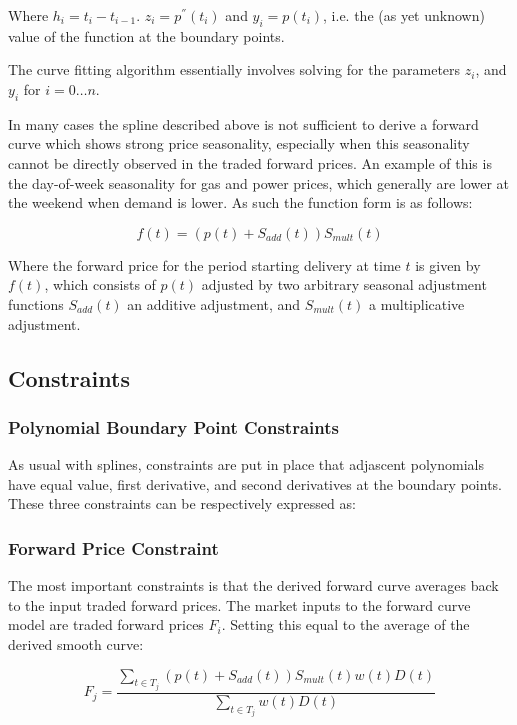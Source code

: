 \documentclass{article}
\begin{document}
Where $h_i =  t_i - t_{i-1}$. 
$z_i = p^{''}(t_i)$ and $y_i = p(t_i)$, i.e. the (as yet unknown) value of the function at
the boundary points.

The curve fitting algorithm essentially involves solving for the parameters
$z_i$, and $y_i$ for $i=0 \hdots n$.

\bigskip
In many cases the spline described above is not sufficient to derive a forward curve which
shows strong price seasonality, especially when this seasonality cannot be directly observed
in the traded forward prices. An example of this is the day-of-week seasonality for gas and
power prices, which generally are lower at the weekend when demand is lower. As such the 
function form is as follows:

\begin{equation}
    \label{eq:foward_function}
    f(t) = (p(t) + S_{add}(t))S_{mult}(t)
\end{equation}

Where the forward price for the period starting delivery at time $t$ is given by $f(t)$, which 
consists of $p(t)$ adjusted by two arbitrary seasonal adjustment functions
$S_{add}(t)$ an additive adjustment, and $S_{mult}(t)$ a multiplicative adjustment.


\subsection{Constraints}
\subsubsection{Polynomial Boundary Point Constraints}
As usual with splines, constraints are put in place that adjascent polynomials have equal value, first derivative, and second derivatives at the boundary points.
These three constraints can be respectively expressed as:

\subsubsection{Forward Price Constraint}
The most important constraints is that the derived forward curve averages back to the 
input traded forward prices.
The market inputs to the forward curve model are traded forward prices $F_i$.
Setting this equal to the average of the derived smooth curve:

\begin{equation}
    \label{eq:traded_forward_calc}
    F_j = \frac{\sum_{t \in T_j} (p(t) + S_{add}(t))S_{mult}(t)w(t)D(t)}
    {\sum_{t \in T_j} w(t)D(t)}
\end{equation}
\end{document}
